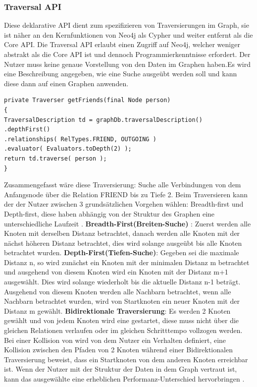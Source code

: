 \subsubsection{Traversal API}
Diese deklarative API  dient zum spezifizieren von Traversierungen im Graph, sie ist näher an den Kernfunktionen von Neo4j als Cypher und weiter entfernt als die Core API. Die Traversal API erlaubt einen  Zugriff auf Neo4j, welcher weniger abstrakt als die Core API ist und dennoch Programmierkenntnisse erfordert. Der Nutzer muss keine genaue Vorstellung von den Daten im Graphen haben.Es wird eine Beschreibung angegeben, wie eine Suche  ausgeübt werden soll und kann diese dann auf einen Graphen anwenden. 
\begin{Verbatim}[frame=single]
private Traverser getFriends(final Node person)
{
TraversalDescription td = graphDb.traversalDescription()
.depthFirst()
.relationships( RelTypes.FRIEND, OUTGOING )
.evaluator( Evaluators.toDepth(2) );
return td.traverse( person );
}
\end{Verbatim}
Zusammengefasst wäre diese Traversierung: Suche alle Verbindungen von dem Anfangsnode über die Relation FRIEND bis zu Tiefe 2.  Beim Traversieren kann der der Nutzer zwischen 3 grundsätzlichen Vorgehen wählen: Breadth-first und Depth-first, diese haben abhängig von der Struktur des Graphen eine unterschiedliche Laufzeit \parencite{vukotic2015neo4j}. \newline
\textbf {Breadth-First(Breiten-Suche)} : Zuerst werden alle Knoten mit derselben Distanz betrachtet, danach werden alle Knoten mit der nächst höheren Distanz betrachtet, dies wird solange ausgeübt bis alle Knoten betrachtet wurden. \newline
\textbf {Depth-First(Tiefen-Suche)}: Gegeben sei die maximale Distanz n, so wird zunächst ein Knoten mit der minimalen Distanz m betrachtet und ausgehend von diesem Knoten wird ein Knoten mit der Distanz m+1 ausgewählt. Dies wird solange wiederholt bis die aktuelle Distanz n-1 beträgt. Ausgehend von diesem Knoten werden alle Nachbarn betrachtet, wenn alle Nachbarn betrachtet wurden, wird von Startknoten ein neuer Knoten mit der Distanz m gewählt.
\textbf {Bidirektionale Traversierung}: Es werden 2 Knoten gewählt und von jedem Knoten wird eine  gestartet, diese muss nicht über die gleichen Relationen verlaufen oder im gleichen Schritttempo vollzogen werden. Bei einer Kollision von wird von dem Nutzer ein Verhalten definiert, eine Kollision zwischen den Pfaden von 2 Knoten während einer Bidirektionalen Traversierung beweist, dass  ein Startknoten von dem anderen Knoten erreichbar ist.
\newline
\newline
Wenn der Nutzer mit der Struktur der Daten in dem Graph vertraut ist, kann das ausgewählte eine erheblichen Performanz-Unterschied  hervorbringen \parencite{vukotic2015neo4j}. 

